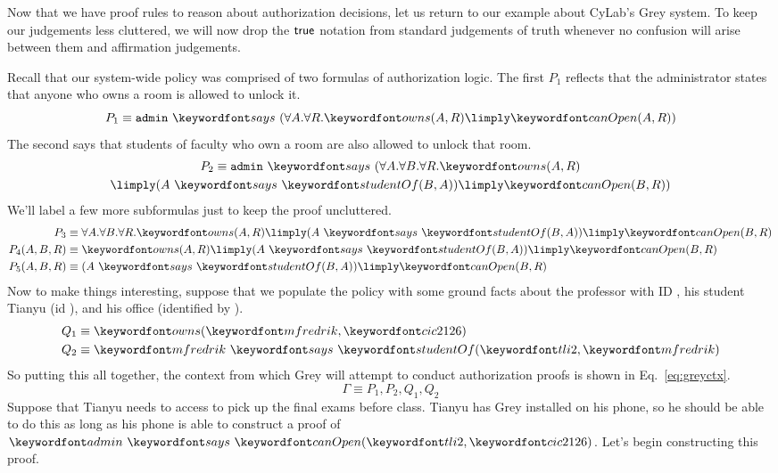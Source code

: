 \documentclass[11pt,twoside]{scrartcl}
\begin{document}
Now that we have proof rules to reason about authorization decisions, let us return to our example about CyLab's Grey system. To keep our judgements less cluttered, we will now drop the $\mathsf{true}$ notation from standard judgements of truth whenever no confusion will arise between them and affirmation judgements.

Recall that our system-wide policy was comprised of two formulas of authorization logic. The first $P_1$ reflects that the administrator states that anyone who owns a room is allowed to unlock it.
\[
P_1 \equiv \says{\mathtt{admin}}{(\forall A.\forall R. \ownsr(A,R) \limply \canopen(A,R))}
\]
The second says that students of faculty who own a room are also allowed to unlock that room.
\begin{multline*}
P_2 \equiv \says{\mathtt{admin}}{(\forall A.\forall B.\forall R. \ownsr(A,R) \\ \limply (\says{A}{\studof(B,A)}) \limply \canopen(B,R))}
\end{multline*}
We'll label a few more subformulas just to keep the proof uncluttered.
\begin{align*}
P_3 &\equiv \forall A.\forall B.\forall R. \ownsr(A,R) \limply (\says{A}{\studof(B,A)}) \limply \canopen(B,R) \\
P_4(A,B,R) &\equiv \ownsr(A,R) \limply (\says{A}{\studof(B,A)}) \limply \canopen(B,R) \\
P_5(A,B,R) &\equiv (\says{A}{\studof(B,A)}) \limply \canopen(B,R)
\end{align*}
Now to make things interesting, suppose that we populate the policy with some ground facts about the professor with ID \matt, his student Tianyu (id \tli), and his office (identified by \office).
\begin{align*}
Q_1 &\equiv \ownsr(\matt,\office) \\
Q_2 &\equiv \says{\matt}{\studof(\tli,\matt)}
\end{align*}
So putting this all together, the context from which Grey will attempt to conduct authorization proofs is shown in Eq.~\ref{eq:greyctx}.
\begin{equation}
\label{eq:greyctx}
\Gamma \equiv P_1,P_2,Q_1,Q_2
\end{equation}
Suppose that Tianyu needs to access \office to pick up the final exams before class. Tianyu has Grey installed on his phone, so he should be able to do this as long as his phone is able to construct a proof of $\says{\admin}{\canopen(\tli,\office)}$. Let's begin constructing this proof. 
\end{document}
